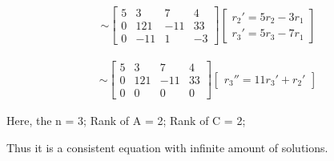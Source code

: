 \documentclass{article}
\begin{document}
\begin{align*}
    \sim\left[\begin{array}{ccc|c}
    5 & 3 & 7 & 4 \\
    0 & 121 & -11 & 33 \\
    0 & -11 & 1 & -3
    \end{array}\right]
    \begin{bmatrix}
        r_2' = 5r_2 - 3r_1  \\ r_3' = 5r_3 - 7r_1
    \end{bmatrix}
\end{align*}

\begin{align*}
    \sim\left[\begin{array}{ccc|c}
    5 & 3 & 7 & 4 \\
    0 & 121 & -11 & 33 \\
    0 & 0 & 0 & 0
    \end{array}\right]
    \begin{bmatrix}
        r_3'' = 11r_3' + r_2' 
    \end{bmatrix}
\end{align*}

Here, the n = 3; Rank of A = 2; Rank of C = 2;

Thus it is a consistent equation with infinite amount of solutions.
\end{document}
